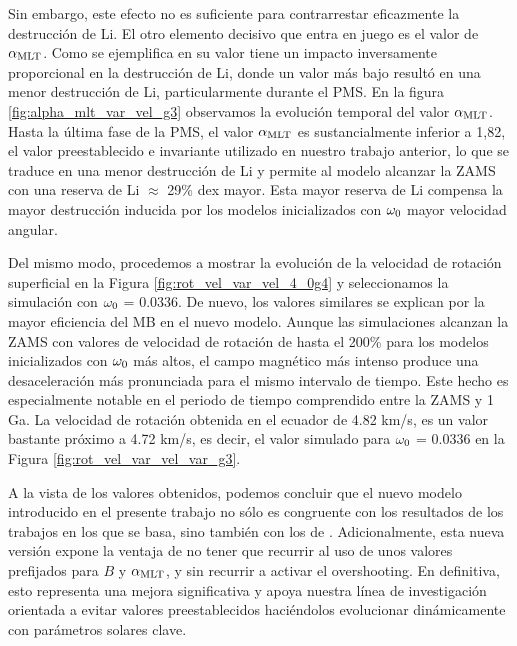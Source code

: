 Sin embargo, este efecto no es suficiente para contrarrestar eficazmente la destrucción de Li. El otro elemento decisivo que entra en juego es el valor de $\alpha_{\mathrm{MLT}}$. Como se ejemplifica en \cite{Caballero2020} su valor tiene un impacto inversamente proporcional en la destrucción de Li, donde un valor más bajo resultó en una menor destrucción de Li, particularmente durante el PMS. En la figura \ref{fig:alpha_mlt_var_vel_g3} observamos la evolución temporal del valor $\alpha_{\mathrm{MLT}}$. Hasta la última fase de la PMS, el valor $\alpha_{\mathrm{MLT}}$ es sustancialmente inferior a 1,82, el valor preestablecido e invariante utilizado en nuestro trabajo anterior, lo que se traduce en una menor destrucción de Li y permite al modelo alcanzar la ZAMS con una reserva de Li $\approx$ 29\% dex mayor. Esta mayor reserva de Li compensa la mayor destrucción inducida por los modelos inicializados con $\omega_{\mathrm{0}}$ mayor velocidad angular.\par

Del mismo modo, procedemos a mostrar la evolución de la velocidad de rotación superficial en la Figura \ref{fig:rot_vel_var_vel_4_0g4} y seleccionamos la simulación con $\omega_{\mathrm{0}}$ = 0.0336. De nuevo, los valores similares se explican por la mayor eficiencia del MB en el nuevo modelo. Aunque las simulaciones alcanzan la ZAMS con valores de velocidad de rotación de hasta el 200\% para los modelos inicializados con $\omega_{\mathrm{0}}$ más altos, el campo magnético más intenso produce una desaceleración más pronunciada para el mismo intervalo de tiempo. Este hecho es especialmente notable en el periodo de tiempo comprendido entre la ZAMS y 1 Ga. La velocidad de rotación obtenida en el ecuador de 4.82 km/s, es un valor bastante próximo a 4.72 km/s, es decir, el valor simulado para $\omega_{\mathrm{0}}$ = 0.0336 en la Figura \ref{fig:rot_vel_var_vel_var_g3}.\par

A la vista de los valores obtenidos, podemos concluir que el nuevo modelo introducido en el presente trabajo no sólo es congruente con los resultados de los trabajos en los que se basa, sino también con los de \cite{Caballero2020}. Adicionalmente, esta nueva versión expone la ventaja de no tener que recurrir al uso de unos valores prefijados para $B$ y $\alpha_{\mathrm{MLT}}$, y sin recurrir a activar el overshooting. En definitiva, esto representa una mejora significativa y apoya nuestra línea de investigación orientada a evitar valores preestablecidos haciéndolos evolucionar dinámicamente con parámetros solares clave.\par



